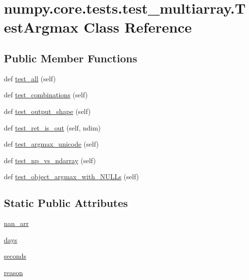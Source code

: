 \hypertarget{classnumpy_1_1core_1_1tests_1_1test__multiarray_1_1TestArgmax}{}\section{numpy.\+core.\+tests.\+test\+\_\+multiarray.\+Test\+Argmax Class Reference}
\label{classnumpy_1_1core_1_1tests_1_1test__multiarray_1_1TestArgmax}
\subsection*{Public Member Functions}
\begin{DoxyCompactItemize}
\item 
def \hyperlink{classnumpy_1_1core_1_1tests_1_1test__multiarray_1_1TestArgmax_a907f26d62075d21baf2811a2415f531f}{test\+\_\+all} (self)
\item 
def \hyperlink{classnumpy_1_1core_1_1tests_1_1test__multiarray_1_1TestArgmax_a4ebe3ac655f49151cce3a3cf329841a7}{test\+\_\+combinations} (self)
\item 
def \hyperlink{classnumpy_1_1core_1_1tests_1_1test__multiarray_1_1TestArgmax_acaff2135ed69e84e9d5fc5a2d5142216}{test\+\_\+output\+\_\+shape} (self)
\item 
def \hyperlink{classnumpy_1_1core_1_1tests_1_1test__multiarray_1_1TestArgmax_aa63f80cd9ab7148b3f866e5f99bd6340}{test\+\_\+ret\+\_\+is\+\_\+out} (self, ndim)
\item 
def \hyperlink{classnumpy_1_1core_1_1tests_1_1test__multiarray_1_1TestArgmax_a5712498c4f80acd8bb2e11c7e8cd27e1}{test\+\_\+argmax\+\_\+unicode} (self)
\item 
def \hyperlink{classnumpy_1_1core_1_1tests_1_1test__multiarray_1_1TestArgmax_a80759785034537b20e0341f5ede7cb68}{test\+\_\+np\+\_\+vs\+\_\+ndarray} (self)
\item 
def \hyperlink{classnumpy_1_1core_1_1tests_1_1test__multiarray_1_1TestArgmax_a1fcaad38a361a762088eacb48664b5b3}{test\+\_\+object\+\_\+argmax\+\_\+with\+\_\+\+N\+U\+L\+Ls} (self)
\end{DoxyCompactItemize}
\subsection*{Static Public Attributes}
\begin{DoxyCompactItemize}
\item 
\hyperlink{classnumpy_1_1core_1_1tests_1_1test__multiarray_1_1TestArgmax_a23f81dfb98e6bd74bbba645958f1f704}{nan\+\_\+arr}
\item 
\hyperlink{classnumpy_1_1core_1_1tests_1_1test__multiarray_1_1TestArgmax_a64879230de6ac049fbe38bc61e4f5522}{days}
\item 
\hyperlink{classnumpy_1_1core_1_1tests_1_1test__multiarray_1_1TestArgmax_afbe3df411422a5d15a38b5447e43905a}{seconds}
\item 
\hyperlink{classnumpy_1_1core_1_1tests_1_1test__multiarray_1_1TestArgmax_a4457a787b78d1b698421f0f7e8681434}{reason}
\end{DoxyCompactItemize}


